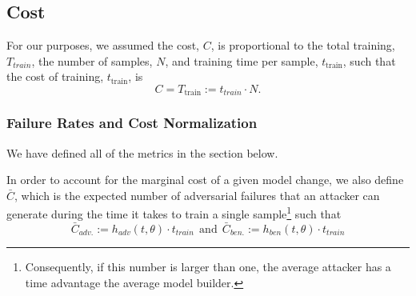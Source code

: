 \subsection{Cost}\label{cost}

For our purposes, we assumed the cost, $C$, is proportional to the total training, $T_{train}$, the number of samples, $N$, and training time per sample, $t_{\mathrm{train}}$, such that the cost of training, $t_{\mathrm{train}}$, is
\[
    C = T_{\mathrm{train}} := t_{train} \cdot N.
\]




\subsubsection{Failure Rates and Cost Normalization}
We have defined all of the metrics in the section below.
\label{metrics}

In order to account for the marginal cost of a given model change, we also define $\bar{C}$, which is the expected number of adversarial failures that an attacker can generate during the time it takes to train a single sample\footnote{Consequently, if this number is larger than one, the average attacker has a time advantage the average model builder.} such that
\begin{equation}
    \bar{C}_{adv.} := h_{adv}(t, \theta) \cdot t_{train}
     ~~\textrm{and}~~
     \bar{C}_{ben.} := h_{ben}(t, \theta) \cdot t_{train}
\label{eq:cost}
\end{equation}







